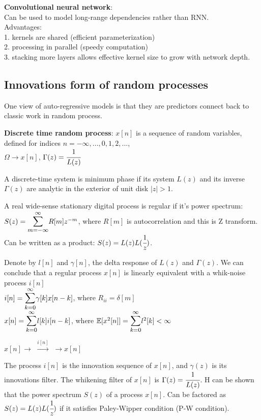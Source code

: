 \documentclass[12pt,a4paper]{article}
\begin{document}

\textbf{Convolutional neural network}:\\
Can be used to model long-range dependencies rather than RNN. \\
Advantages:\\
1. kernels are shared (efficient parameterization)\\
2. processing in parallel (speedy computation) \\
3. stacking more layers allows effective kernel size to grow with network depth. 



\subsection{Innovations form of random processes}
One view of auto-regressive models is that they are predictors connect back to classic work in random process. 

\textbf{Discrete time random process}:
$x[n]$ is a sequence of random variables, defined for indices $n=-\infty,...,0,1,2,...$, \\
$\Omega\rightarrow x[n]$, $\Gamma(z)=\cfrac{1}{L(z)}$

A discrete-time system is minimum phase if its system $L(z)$ and its inverse $\Gamma(z)$ are analytic in the exterior of unit disk $|z|>1$. 

A real wide-sense stationary digital process is regular if it's power spectrum:\\
$S(z)=\bsum{m=-\infty}{\infty} R[m]z^{-m}$, where $R[m]$ is autocorrelation and this is Z transform. 
Can be written as a product: $S(z)=L(z)L(\cfrac{1}{z})$. 

\vspace{0.5cm}
Denote by $l[n]$ and $\gamma[n]$, the delta response of $L(z)$ and $\Gamma(z)$. 
We can conclude that a regular process $x[n]$ is linearly equivalent with a whik-noise process $i[n]$\\
$i[n]=\bsum{k=0}{\infty}\gamma[k]x[n-k]$, where $R_{ii}=\delta[m]$\\
$x[n]=\bsum{k=0}{\infty}l[k]i[n-k]$, where $\ee[x^2[n]]=\bsum{k=0}{\infty}l^2[k]<\infty$

$x[n] \longrightarrow $ $\overset{i[n]}{\longrightarrow}$  $\longrightarrow x[n]$

The process $i[n]$ is the innovation sequence of $x[n]$, and $\gamma(z)$ is its innovations filter. 
The whikening filter of $x[n]$ is $\Gamma(z)=\cfrac{1}{L(z)}$. H can be shown that the power spectrum $S(z)$ of a process $x[n]$. 
Can be factored as $S(z)=L(z)L(\cfrac{1}{z})$ if it satisfies Paley-Wipper condition (P-W condition).
\end{document}
